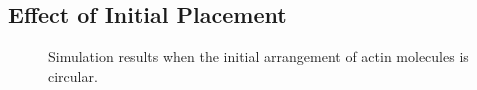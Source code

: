 \documentclass[a4paper,12pt]{book}
\begin{document}
\subsection{Effect of Initial Placement}

\begin{figure}[tbp]
 \caption{Simulation results when the initial arrangement of actin molecules is circular.}
 \label{fig:res4}
\end{figure}
\end{document}
